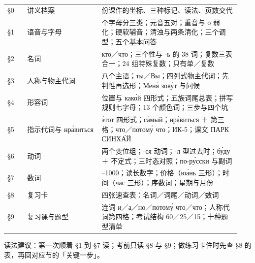 ﻿%

\begin{minipage}{\linewidth}
\small
\begin{tabular}{@{}>{\raggedright\arraybackslash}p{0.08\linewidth}>{\raggedright\arraybackslash}p{0.30\linewidth}>{\raggedright\arraybackslash}p{0.56\linewidth}@{}}
\S0 & 讲义档案 & 12 份课件的坐标、三种标记、读法、页数交代 \\
\S1 & 语音与字母 & 33 个字母分三类；元音五对；重音与 о 弱化；硬软辅音；清浊与两条清化；三个调型；五个基本问答 \\
\S2 & 名词 & кто／что；三个性与 -ь 的 38 词；复数三表合一；24 组特殊复数；只有单／复数 \\
\S3 & 人称与物主代词 & 八个主语；ты／Вы；四列式物主代词；先判性再选形；Меня́ зову́т 与问候 \\
\S4 & 形容词 & 位置与 како́й 四形式；五族词尾总表；拼写规则七字母；13 个颜色词；三步与四个坑 \\
\S5 & 指示代词与 нра́виться & э́тот 四形式；са́мый；нра́виться ＋ 第三格；что／потому́ что；ИК-5；课文 ПАРК СИНХА́Й \\
\S6 & 动词 & 两个变位组；-ся 动词；-л 型过去时；бу́ду ＋ 不定式；三时态对照；по-ру́сски 与副词 \\
\S7 & 数词 & 1--1000；读长数字；价格（юа́нь 三形）；时间（час 三形）；序数词；星期与月份 \\
\S8 & 复习卡 & 四张速查表：名词／词尾／动词／数词 \\
\S9 & 复习课与题型 & 连词 и／а／но／потому́ что／что；人称代词第四格；考试结构 60／25／15；十种题型清单 \\
\end{tabular}
\end{minipage}

\vspace{2pt}

{\small\color{inkgray}读法建议：第一次顺着 \S1 到 \S7 读；考前只读 \S8 与 \S9；做练习卡住时先查 \S8 的表，再回对应节的「关键一步」。}
